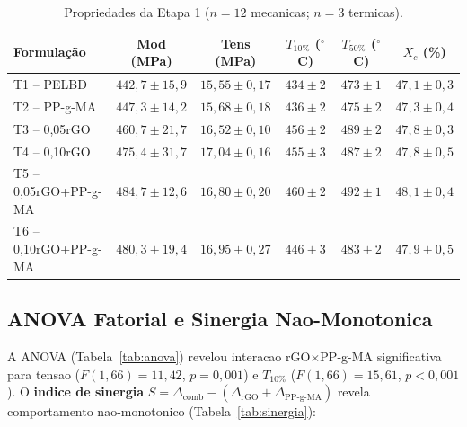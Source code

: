 \documentclass[11pt,a4paper,oneside]{article}
\begin{document}
\begin{table}[H]\centering
\caption{Propriedades da Etapa 1 ($n{=}12$ mecanicas; $n{=}3$ termicas).}\label{tab:etapa1}
\begin{tabular}{lccccc}
\toprule
{\bfseries Formulação} & {\bfseries Mod (MPa)} & {\bfseries Tens (MPa)} & {\bfseries $T_{10\%}$ ($^{\circ}$C)} & {\bfseries $T_{50\%}$ ($^{\circ}$C)} & {\bfseries $X_c$ (\%)} \\
\midrule
T1 -- PELBD         & $442{,}7{\pm}15{,}9$ & $15{,}55{\pm}0{,}17$ & $434{\pm}2$ & $473{\pm}1$ & $47{,}1{\pm}0{,}3$ \\
T2 -- PP-g-MA       & $447{,}3{\pm}14{,}2$ & $15{,}68{\pm}0{,}18$ & $436{\pm}2$ & $475{\pm}2$ & $47{,}3{\pm}0{,}4$ \\
T3 -- 0,05rGO       & $460{,}7{\pm}21{,}7$ & $16{,}52{\pm}0{,}10$ & $456{\pm}2$ & $489{\pm}2$ & $47{,}8{\pm}0{,}3$ \\
T4 -- 0,10rGO       & $475{,}4{\pm}31{,}7$ & $17{,}04{\pm}0{,}16$ & $455{\pm}3$ & $487{\pm}2$ & $47{,}8{\pm}0{,}5$ \\
T5 -- 0,05rGO+PP-g-MA & $484{,}7{\pm}12{,}6$ & $16{,}80{\pm}0{,}20$ & $460{\pm}2$ & $492{\pm}1$ & $48{,}1{\pm}0{,}4$ \\
T6 -- 0,10rGO+PP-g-MA & $480{,}3{\pm}19{,}4$ & $16{,}95{\pm}0{,}27$ & $446{\pm}3$ & $483{\pm}2$ & $47{,}9{\pm}0{,}5$ \\
\bottomrule
\end{tabular}
\end{table}

\subsection{ANOVA Fatorial e Sinergia Nao-Monotonica}

A ANOVA (Tabela~\ref{tab:anova}) revelou interacao rGO$\times$PP-g-MA significativa para tensao ($F(1{,}66){=}11{,}42$, $p{=}0{,}001$) e $T_{10\%}$ ($F(1{,}66){=}15{,}61$, $p{<}0{,}001$). O {\bfseries indice de sinergia} $S{=}\Delta_{\text{comb}}{-}(\Delta_{\text{rGO}}{+}\Delta_{\text{PP-g-MA}})$ revela comportamento nao-monotonico (Tabela~\ref{tab:sinergia}):
\end{document}
